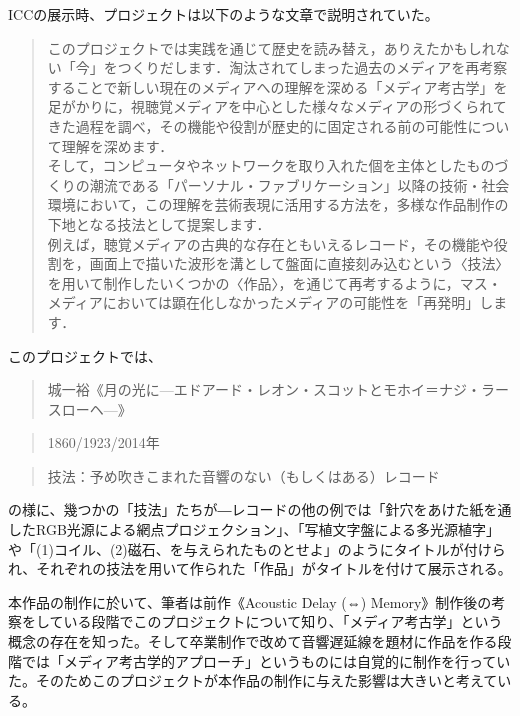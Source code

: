 \documentclass[a4paper,report]{jsbook}
\begin{document}
ICCの展示時、プロジェクトは以下のような文章で説明されていた。

\begin{quote}
このプロジェクトでは実践を通じて歴史を読み替え，ありえたかもしれない「今」をつくりだします．淘汰されてしまった過去のメディアを再考察することで新しい現在のメディアへの理解を深める「メディア考古学」を足がかりに，視聴覚メディアを中心とした様々なメディアの形づくられてきた過程を調べ，その機能や役割が歴史的に固定される前の可能性について理解を深めます．\\
そして，コンピュータやネットワークを取り入れた個を主体としたものづくりの潮流である「パーソナル・ファブリケーション」以降の技術・社会環境において，この理解を芸術表現に活用する方法を，多様な作品制作の下地となる技法として提案します．\\
例えば，聴覚メディアの古典的な存在ともいえるレコード，その機能や役割を，画面上で描いた波形を溝として盤面に直接刻み込むという〈技法〉を用いて制作したいくつかの〈作品〉，を通じて再考するように，マス・メディアにおいては顕在化しなかったメディアの可能性を「再発明」します．\\
\autocite{iamas:RIWP}
\end{quote}

このプロジェクトでは、

\begin{quote}
城一裕《月の光に---エドアード・レオン・スコットとモホイ＝ナジ・ラースローヘ---》
\end{quote}

\begin{quote}
1860/1923/2014年
\end{quote}

\begin{quote}
技法：予め吹きこまれた音響のない（もしくはある）レコード
\end{quote}

の様に、幾つかの「技法」たちが―レコードの他の例では「針穴をあけた紙を通したRGB光源による網点プロジェクション」、「写植文字盤による多光源植字」や「(1)コイル、(2)磁石、を与えられたものとせよ」のようにタイトルが付けられ、それぞれの技法を用いて作られた「作品」がタイトルを付けて展示される。

本作品の制作に於いて、筆者は前作《Acoustic Delay (⇔)
Memory》制作後の考察をしている段階でこのプロジェクトについて知り、「メディア考古学」という概念の存在を知った。そして卒業制作で改めて音響遅延線を題材に作品を作る段階では「メディア考古学的アプローチ」というものには自覚的に制作を行っていた。そのためこのプロジェクトが本作品の制作に与えた影響は大きいと考えている。
\end{document}
